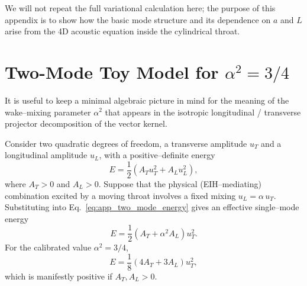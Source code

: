 \documentclass[12pt]{article}
\begin{document}
We will not repeat the full variational calculation here; the purpose of
this appendix is to show how the basic mode structure and its dependence on
$a$ and $L$ arise from the 4D acoustic equation inside the cylindrical
throat.

\section{Two-Mode Toy Model for \texorpdfstring{$\alpha^2 = 3/4$}{alpha squared = 3/4}}
\label{app:two_mode_details}

It is useful to keep a minimal algebraic picture in mind for the meaning of the
wake--mixing parameter $\alpha^2$ that appears in the isotropic longitudinal /
transverse projector decomposition of the vector kernel.

Consider two quadratic degrees of freedom, a transverse amplitude $u_T$ and a
longitudinal amplitude $u_L$, with a positive--definite energy
\begin{equation}
  E = \frac{1}{2}\left(A_T u_T^2 + A_L u_L^2\right),
  \label{eq:app_two_mode_energy}
\end{equation}
where $A_T>0$ and $A_L>0$.
Suppose that the physical (EIH--mediating) combination excited by a moving
throat involves a fixed mixing $u_L=\alpha\,u_T$.  Substituting into
Eq.~\eqref{eq:app_two_mode_energy} gives an effective single--mode energy
\begin{equation}
  E = \frac{1}{2}\left(A_T+\alpha^2 A_L\right)u_T^2.
\end{equation}
For the calibrated value $\alpha^2=3/4$,
\begin{equation}
  E = \frac{1}{8}\left(4A_T+3A_L\right)u_T^2,
\end{equation}
which is manifestly positive if $A_T,A_L>0$.
\end{document}
